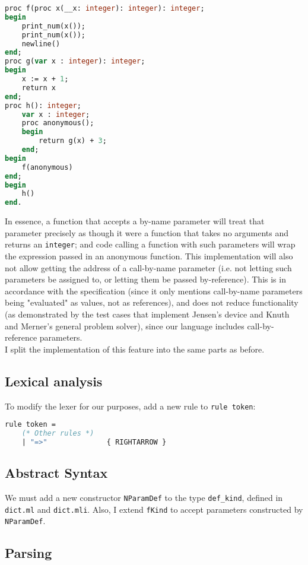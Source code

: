 \documentclass[a4paper,9pt]{article}
\begin{document}
\begin{lstlisting}[language=pascal]
proc f(proc x(__x: integer): integer): integer;
begin
    print_num(x());
    print_num(x());
    newline()
end;
proc g(var x : integer): integer;
begin
    x := x + 1;
    return x
end;
proc h(): integer;
    var x : integer;
    proc anonymous();
    begin
        return g(x) + 3;
    end;
begin
    f(anonymous)
end;
begin
    h()
end.
\end{lstlisting}
In essence, a function that accepts a by-name parameter will treat that parameter precisely as though it were a function that takes no arguments and returns an \texttt{integer}; and code calling a function with such parameters will wrap the expression passed in an anonymous function. This implementation will also not allow getting the address of a call-by-name parameter (i.e. not letting such parameters be assigned to, or letting them be passed by-reference). This is in accordance with the specification (since it only mentions call-by-name parameters being "evaluated" as values, not as references), and does not reduce functionality (as demonstrated by the test cases that implement Jensen's device and Knuth and Merner's general problem solver), since our language includes call-by-reference parameters. \\
I split the implementation of this feature into the same parts as before.

\subsection{Lexical analysis}
To modify the lexer for our purposes, add a new rule to \texttt{rule token}:
\begin{lstlisting}[language=ml]
rule token =
    (* Other rules *)
    | "=>"              { RIGHTARROW }
\end{lstlisting}

\subsection{Abstract Syntax}
We must add a new constructor \texttt{NParamDef} to the type \texttt{def\_kind}, defined in \texttt{dict.ml} and \texttt{dict.mli}. Also, I extend \texttt{fKind} to accept parameters constructed by \texttt{NParamDef}.

\subsection{Parsing}
\end{document}
